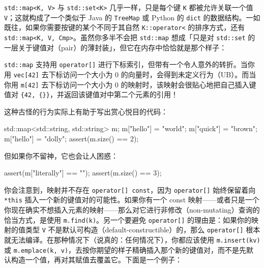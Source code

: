 \texttt{std::\allowbreak{}map<\allowbreak{}K,\allowbreak{} V>\allowbreak{}} 与 \texttt{std::\allowbreak{}set<\allowbreak{}K>\allowbreak{}} 几乎一样，只是每个键 \texttt{K} 都被允许关联一个值 \texttt{V}；这就构成了一个类似于 Java 的 \texttt{Tree\allowbreak{}Map} 或 Python 的 \texttt{dict} 的数据结构。一如既往，如果你需要按键的某个不同于其自然 \texttt{K::\allowbreak{}operator<} 的排序方式，还有 \texttt{std::\allowbreak{}map<\allowbreak{}K,\allowbreak{} V,\allowbreak{} Cmp>\allowbreak{}}。虽然你多半不会把 \texttt{std::\allowbreak{}map} 想成「只是对 \texttt{std::\allowbreak{}set} 的一层关于键值对（pair）的薄封装」，但它在内存中恰恰就是那个样子：


\texttt{std::\allowbreak{}map} 支持用 \texttt{operator[]} 进行下标索引，但带有一个令人意外的转折。当你用 \texttt{vec[42]} 去下标访问一个大小为 0 的向量时，会得到未定义行为（UB）。而当你用 \texttt{m[42]} 去下标访问一个大小为 0 的映射时，该映射会很贴心地把自己插入键值对 \texttt{\{42,\allowbreak{} \{\}\}}，并返回该键值对中第二个元素的引用！

这种古怪的行为实际上有助于写出赏心悦目的代码：

\begin{codebox}[cpp]
    std::map<std::string, std::string> m;
    m["hello"] = "world";
    m["quick"] = "brown";
    m["hello"] = "dolly";
    assert(m.size() == 2);
\end{codebox}

但如果你不留神，它也会让人困惑：

\begin{codebox}[cpp]
    assert(m["literally"] == "");
    assert(m.size() == 3);
\end{codebox}

你会注意到，映射并不存在 \texttt{operator[] const}，因为 \texttt{operator[]} 始终保留着向 \texttt{*this} 插入一个新的键值对的可能性。如果你有一个 const 映射——或者只是一个你现在确实不想插入元素的映射——那么对它进行非修改（non-mutating）查询的恰当方式，是使用 \texttt{m.\allowbreak{}find(\allowbreak{}k)\allowbreak{}}。另一个要避免 \texttt{operator[]} 的理由是：如果你的映射的值类型 \texttt{V} 不是默认可构造（default-constructible）的，那么 \texttt{operator[]} 根本就无法编译。在那种情况下（说真的：任何情况下），你都应该使用 \texttt{m.\allowbreak{}insert(\allowbreak{}kv)\allowbreak{}} 或 \texttt{m.\allowbreak{}emplace(\allowbreak{}k,\allowbreak{} v)\allowbreak{}}，去按你期望的样子精确插入那个新的键值对，而不是先默认构造一个值，再对其赋值去覆盖它。下面是一个例子：

